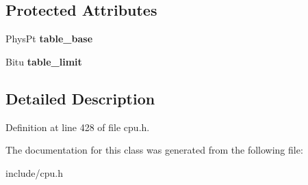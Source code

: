 \subsection*{Protected Attributes}
\begin{DoxyCompactItemize}
\item 
\hypertarget{classDescriptorTable_a98077958af230be31af60525318ee702}{Phys\-Pt {\bfseries table\-\_\-base}}\label{classDescriptorTable_a98077958af230be31af60525318ee702}

\item 
\hypertarget{classDescriptorTable_aee4c9d381d9092de9af52396044bbd72}{Bitu {\bfseries table\-\_\-limit}}\label{classDescriptorTable_aee4c9d381d9092de9af52396044bbd72}

\end{DoxyCompactItemize}


\subsection{Detailed Description}


Definition at line 428 of file cpu.\-h.



The documentation for this class was generated from the following file\-:\begin{DoxyCompactItemize}
\item 
include/cpu.\-h\end{DoxyCompactItemize}

